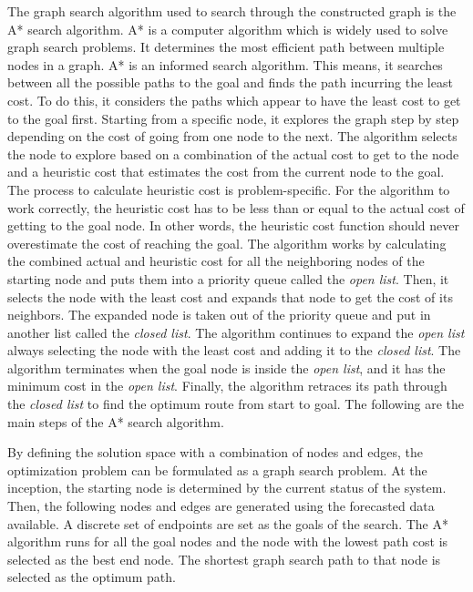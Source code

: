 The graph search algorithm used to search through the constructed graph is the A* search algorithm. A* is a computer algorithm which is widely used to solve graph search problems. It determines the most efficient path between multiple nodes in a graph. A* is an informed search algorithm. This means, it searches between all the possible paths to the goal and finds the path incurring the least cost. To do this, it considers the paths which appear to have the least cost to get to the goal first. Starting from a specific node, it explores the graph step by step depending on the cost of going from one node to the next. The algorithm selects the node to explore based on a combination of the actual cost to get to the node and a heuristic cost that estimates the cost from the current node to the goal. The process to calculate heuristic cost is problem-specific. For the algorithm to work correctly, the heuristic cost has to be less than or equal to the actual cost of getting to the goal node. In other words, the heuristic cost function should never overestimate the cost of reaching the goal. The algorithm works by calculating the combined actual and heuristic cost for all the neighboring nodes of the starting node and puts them into a priority queue called the \textit{open list}. Then, it selects the node with the least cost and expands that node to get the cost of its neighbors. The expanded node is taken out of the priority queue and put in another list called the \textit{closed list}. The algorithm continues to expand the \textit{open list} always selecting the node with the least cost and adding it to the \textit{closed list}. The algorithm terminates when the goal node is inside the \textit{open list}, and it has the minimum cost in the \textit{open list}. Finally, the algorithm retraces its path through the \textit{closed list} to find the optimum route from start to goal. The following are the main steps of the A* search algorithm.


By defining the solution space with a combination of nodes and edges, the optimization problem can be formulated as a graph search problem. At the inception, the starting node is determined by the current status of the system. Then, the following nodes and edges are generated using the forecasted data available. A discrete set of endpoints are set as the goals of the search. The A* algorithm runs for all the goal nodes and the node with the lowest path cost is selected as the best end node. The shortest graph search path to that node is selected as the optimum path.

